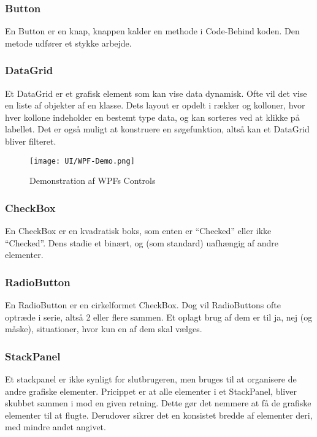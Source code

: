 \subsubsection*{Button}
En Button er en knap, knappen kalder en methode i Code-Behind koden. 
Den metode udfører et stykke arbejde.

\subsubsection*{DataGrid}
Et DataGrid er et grafisk element som kan vise data dynamisk.
Ofte vil det vise en liste af objekter af en klasse.
Dets layout er opdelt i rækker og kolloner, hvor hver kollone indeholder en bestemt type data, og kan sorteres ved at klikke på labellet.
Det er også muligt at konstruere en søgefunktion, altså kan et DataGrid bliver filteret.

\begin{wrapfigure}[22]{R}{0.5\textwidth}
    \label{img:wpfdemo}
    \vspace{-30pt}
    \begin{center}
        \texttt{[image: UI/WPF-Demo.png]}
    \end{center}
    \vspace{-15pt}
    \caption{Demonstration af WPFs Controls}
    \vspace{-15pt}
\end{wrapfigure}

\subsubsection*{CheckBox}
En CheckBox er en kvadratisk boks, som enten er ``Checked'' eller ikke ``Checked''. 
Dens stadie et binært, og (som standard) uafhængig af andre elementer.

\subsubsection*{RadioButton}
En RadioButton er en cirkelformet CheckBox.
Dog vil RadioButtons ofte optræde i serie, altså 2 eller flere sammen.
Et oplagt brug af dem er til ja, nej (og måske), situationer, hvor kun en af dem skal vælges.

\subsubsection*{StackPanel}
Et stackpanel er ikke synligt for slutbrugeren, men bruges til at organisere de andre grafiske elementer.
Pricippet er at alle elementer i et StackPanel, bliver skubbet sammen i mod en given retning.
Dette gør det nemmere at få de grafiske elementer til at flugte.
Derudover sikrer det en konsistet bredde af elementer deri, med mindre andet angivet.

